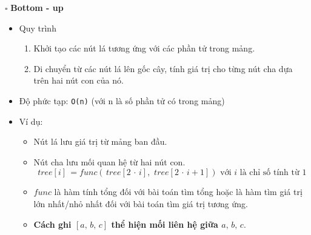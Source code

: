 \documentclass[a4paper]{article}
\begin{document}
\noindent $\square$ \textbf{Bottom - up}
\begin{itemize}[label = $\circ$]
    \item Quy trình
    \begin{enumerate}
        \item Khởi tạo các nút lá tương ứng với các phần tử trong mảng.
        \item Di chuyển từ các nút lá lên gốc cây, tính giá trị cho từng nút cha dựa trên hai nút con của nó.
    \end{enumerate}
    \item Độ phức tạp: \texttt{O(n)} (với n là số phần tử có trong mảng)
    \item Ví dụ:
    \begin{itemize}[label = $\bullet$]
        \item Nút lá lưu giá trị từ mảng ban đầu.
        \item Nút cha lưu mối quan hệ từ hai nút con.
        \[tree[i]\,=func(\,tree[2\, \cdot\, i],\, \,tree[2\, \cdot\, i + 1]) \text{ với $i$ là chỉ số tính từ 1}\]
        \item $func$ là hàm tính tổng đối với bài toán tìm tổng hoặc là hàm tìm giá trị lớn nhất/nhỏ nhất đối với bài toán tìm giá trị tương ứng.
        \item \textbf{Cách ghi $[a,\,b,\,c]$ thể hiện mối liên hệ giữa $a,\,b,\,c$}.
    \end{itemize}
\end{itemize}
\end{document}
